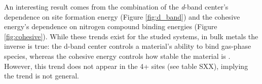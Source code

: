 An interesting result comes from the combination of the \textit{d}-band center's dependence on site formation energy (Figure \ref{fig:d_band}) and the cohesive energy's dependence on nitrogen compound binding energies (Figure \ref{fig:cohesive}). While these trends exist for the studed systems, in bulk metals the inverse is true: the d-band center controls a material's ability to bind gas-phase species, whereas the cohesive energy controls how stable the material is \cite{Hammer_1995}. However, this trend does not appear in the 4+ sites (see table SXX), implying the trend is not general.



